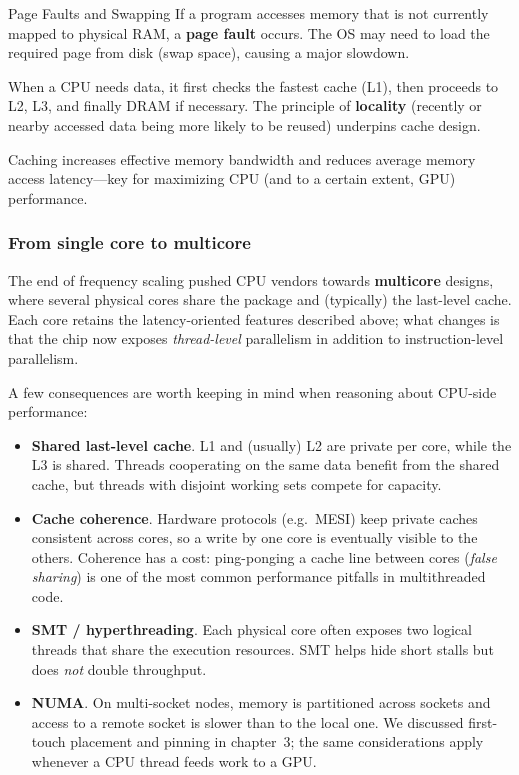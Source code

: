 \begin{warningblock}{Page Faults and Swapping}
    If a program accesses memory that is not currently mapped to physical RAM, a \textbf{page fault} occurs. The OS may need to load the required page from disk (swap space), causing a major slowdown.
\end{warningblock}

When a CPU needs data, it first checks the fastest cache (L1), then proceeds to L2, L3, and finally DRAM if necessary. The principle of \textbf{locality} (recently or nearby accessed data being more likely to be reused) underpins cache design.


Caching increases effective memory bandwidth and reduces average memory access latency---key for maximizing CPU (and to a certain extent, GPU) performance.

\subsubsection{From single core to multicore}

The end of frequency scaling pushed CPU vendors towards \textbf{multicore} designs, where several physical cores share the package and (typically) the last-level cache. Each core retains the latency-oriented features described above; what changes is that the chip now exposes \emph{thread-level} parallelism in addition to instruction-level parallelism.

A few consequences are worth keeping in mind when reasoning about CPU-side performance:
\begin{itemize}
    \item \textbf{Shared last-level cache}. L1 and (usually) L2 are private per core, while the L3 is shared. Threads cooperating on the same data benefit from the shared cache, but threads with disjoint working sets compete for capacity.
    \item \textbf{Cache coherence}. Hardware protocols (e.g.\ MESI) keep private caches consistent across cores, so a write by one core is eventually visible to the others. Coherence has a cost: ping-ponging a cache line between cores (\textit{false sharing}) is one of the most common performance pitfalls in multithreaded code.
    \item \textbf{SMT / hyperthreading}. Each physical core often exposes two logical threads that share the execution resources. SMT helps hide short stalls but does \emph{not} double throughput.
    \item \textbf{NUMA}. On multi-socket nodes, memory is partitioned across sockets and access to a remote socket is slower than to the local one. We discussed first-touch placement and pinning in chapter~3; the same considerations apply whenever a CPU thread feeds work to a GPU.
\end{itemize}

